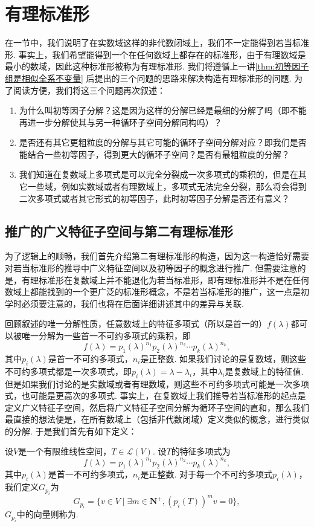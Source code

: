 \chapter{有理标准形}

在一节中，我们说明了在实数域这样的非代数闭域上，我们不一定能得到若当标准形. 事实上，我们希望能得到一个在任何数域上都存在的标准形，由于有理数域是最小的数域，因此这种标准形被称为有理标准形. 我们将遵循上一讲\autoref{thm:初等因子组是相似全系不变量} 后提出的三个问题的思路来解决构造有理标准形的问题. 为了阅读方便，我们将这三个问题再次叙述：
\begin{enumerate}
    \item 为什么叫初等因子分解？这是因为这样的分解已经是最细的分解了吗（即不能再进一步分解使其与另一种循环子空间分解同构吗）？
    \item 是否还有其它更粗粒度的分解与其它可能的循环子空间分解对应？即我们是否能结合一些初等因子，得到更大的循环子空间？是否有最粗粒度的分解？
    \item 我们知道在复数域上多项式是可以完全分裂成一次多项式的乘积的，但是在其它一些域，例如实数域或者有理数域上，多项式无法完全分裂，那么将会得到二次多项式或者其它形式的初等因子，此时初等因子分解是否还有意义？
\end{enumerate}

\section{推广的广义特征子空间与第二有理标准形}
为了逻辑上的顺畅，我们首先介绍第二有理标准形的构造，因为这一构造恰好需要对若当标准形的推导中广义特征空间以及初等因子的概念进行推广. 但需要注意的是，有理标准形在复数域上并不能退化为若当标准形，即有理标准形并不是在任何数域上都能找到的一个更广泛的标准形概念，不是若当标准形的推广，这一点是初学时必须要注意的，我们也将在后面详细讲述其中的差异与关联.

回顾叙述的唯一分解性质，任意数域上的特征多项式（所以是首一的）$f(\lambda)$都可以被唯一分解为一些首一不可约多项式的乘积，即
\[f(\lambda)=p_1(\lambda)^{n_1}p_2(\lambda)^{n_2}\cdots p_k(\lambda)^{n_k},\]
其中$p_i(\lambda)$是首一不可约多项式，$n_i$是正整数. 如果我们讨论的是复数域，则这些不可约多项式都是一次多项式，即$p_i(\lambda)=\lambda-\lambda_i$，其中$\lambda_i$是复数域上的特征值. 但是如果我们讨论的是实数域或者有理数域，则这些不可约多项式可能是一次多项式，也可能是更高次的多项式. 事实上，在复数域上我们推导若当标准形的起点是定义广义特征子空间，然后将广义特征子空间分解为循环子空间的直和，那么我们最直接的想法便是，在所有数域上（包括非代数闭域）定义类似的概念，进行类似的分解. 于是我们首先有如下定义：
\begin{definition}{}{}
    设$V$是一个有限维线性空间，$T\in\mathcal{L}(V)$. 设$T$的特征多项式为
    \[f(\lambda)=p_1(\lambda)^{n_1}p_2(\lambda)^{n_2}\cdots p_k(\lambda)^{n_k},\]
    其中$p_i(\lambda)$是首一不可约多项式，$n_i$是正整数. 对于每一个不可约多项式$p_i(\lambda)$，我们定义$G_{p_i}$为
    \[G_{p_i}=\{v\in V\mid\exists m\in\mathbf{N}^+,(p_i(T))^mv=0\},\]
    $G_{p_i}$中的向量则称为.
\end{definition}

